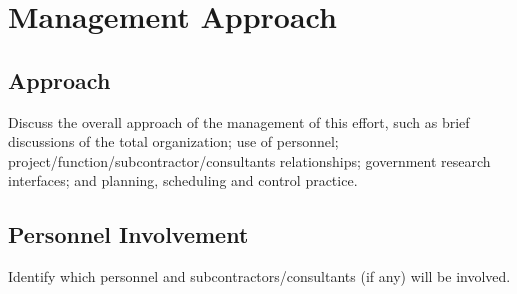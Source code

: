 \section{Management Approach}

\subsection{Approach}
Discuss the overall approach of the management of this effort, such as brief discussions of the total organization; use of personnel; project/function/subcontractor/consultants relationships; government research interfaces; and planning, scheduling and control practice.

\subsection{Personnel Involvement}
Identify which personnel and subcontractors/consultants (if any) will be involved.
